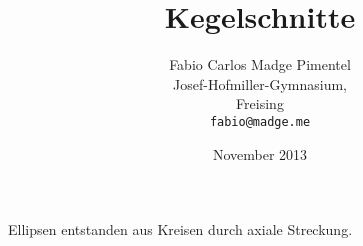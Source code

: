 \documentclass[12pt, a4paper, draft]{report}
\title{Kegelschnitte}
\author{Fabio Carlos Madge Pimentel\\
  Josef-Hofmiller-Gymnasium,\\
  Freising\\
  \texttt{fabio@madge.me}}
\date{November 2013}
\begin{document}


\tableofcontents
\clearpage

Ellipsen entstanden aus Kreisen durch axiale Streckung. ~\cite{Pensel:1993uq}




\clearpage

\end{document}
